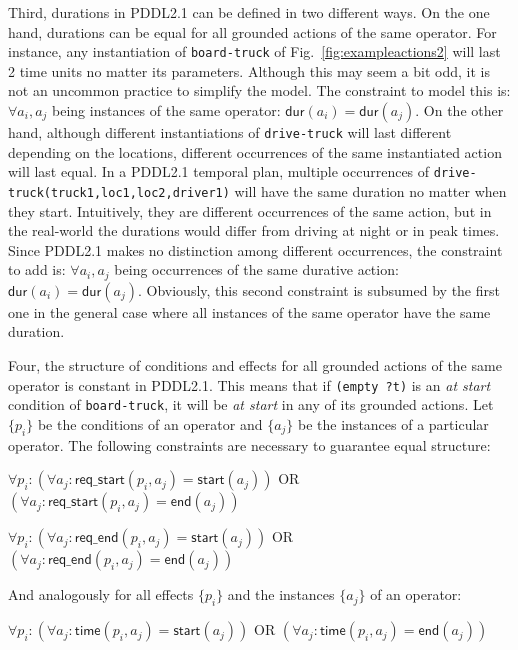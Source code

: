 \documentclass[runningheads]{llncs}
\newcommand{\dur}{\mathsf{dur}}    %
\newcommand{\start}{\mathsf{start}}%
\newcommand{\en}{\mathsf{end}}     %
\newcommand{\tim}{\mathsf{time}}   %
\newcommand{\reqs}{\mathsf{req\_{start}}} %
\newcommand{\reqe}{\mathsf{req\_{end}}}   %
\begin{document}


Third, durations in PDDL2.1 can be defined in two different ways. On the one hand, durations can be equal for all grounded actions of the same operator. For instance, any instantiation of \texttt{board-truck} of Fig.~\ref{fig:exampleactions2} will last 2 time units no matter its parameters. Although this may seem a bit odd, it is not an uncommon practice to simplify the model. The constraint to model this is: $\forall a_i,a_j$ being instances of the same operator: $\dur(a_i) = \dur(a_j)$.
On the other hand, although different instantiations of \texttt{drive-truck} will last different depending on the locations, different occurrences of the same instantiated action will last equal.
In a PDDL2.1 temporal plan, multiple occurrences of \texttt{drive-truck(truck1,loc1,loc2,driver1)} will have the same duration no matter when they start. Intuitively, they are different occurrences of the same action, but in the real-world the durations would differ from driving at night or in peak times. Since PDDL2.1 makes no distinction among different occurrences, the constraint to add is: $\forall a_i,a_j$ being occurrences of the same durative action: $\dur(a_i) = \dur(a_j)$.
Obviously, this second constraint is subsumed by the first one in the general case where all instances of the same operator have the same duration.

Four, the structure of conditions and effects for all grounded actions of the same operator is constant in PDDL2.1. This means that if \texttt{(empty ?t)} is an \emph{at start} condition of \texttt{board-truck}, it will be \emph{at start} in any of its grounded actions.
Let $\{p_i\}$ be the conditions of an operator and $\{a_j\}$ be the instances of a particular operator. The following constraints are necessary to guarantee equal structure:

$\forall p_i: (\forall a_j: \reqs(p_i,a_j) = \start(a_j))$ OR $(\forall a_j: \reqs(p_i,a_j) = \en(a_j))$

$\forall p_i: (\forall a_j: \reqe(p_i,a_j) = \start(a_j))$ OR $(\forall a_j: \reqe(p_i,a_j) = \en(a_j))$

And analogously for all effects $\{p_i\}$ and the instances $\{a_j\}$ of an operator:

$\forall p_i: (\forall a_j: \tim(p_i,a_j) = \start(a_j))$ OR $(\forall a_j: \tim(p_i,a_j) = \en(a_j))$
\end{document}

